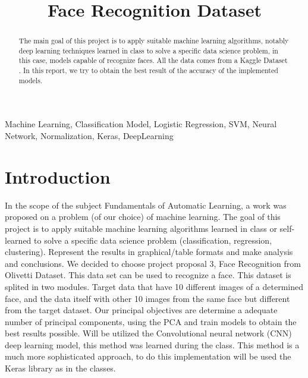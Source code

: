 \documentclass[conference]{IEEEtran}
\begin{document}
\title{Face Recognition Dataset}

\author{
}
\maketitle

\maketitle

\begin{abstract}
The main goal of this project is to apply suitable machine learning algorithms, notably deep learning techniques learned in class to solve a specific data science problem, in this case, models capable of recognize faces. All the data comes from a Kaggle Dataset \cite{dataset}. In this report, we try to obtain the best result of the accuracy of the implemented models.
\end{abstract}

\begin{IEEEkeywords}
Machine Learning, Classification Model, Logistic Regression, SVM, Neural Network, Normalization, Keras, DeepLearning
\end{IEEEkeywords}

\IEEEpeerreviewmaketitle

\section{Introduction}
In the scope of the subject Fundamentals of Automatic Learning, a work was proposed on a problem (of our choice) of machine learning. The goal of this project is to apply suitable machine learning algorithms learned in class or self-learned to solve a specific data science problem (classification, regression, clustering). Represent the results in graphical/table formats and make analysis and conclusions.
We decided to choose project proposal 3, Face Recognition from Olivetti Dataset. This data set can be used to recognize a face. This dataset is splited in two modules. Target data that have 10 different images of a determined face, and the data itself with other 10 images from the same face but different from the target dataset. Our principal objectives are determine a adequate number of principal components, using the PCA and train models to obtain the best results possible. Will be utilized the Convolutional neural network (CNN) deep learning model, this method was learned during the class. This method is a much more sophisticated approach, to do this implementation will be used the Keras library as in the classes.
\end{document}
